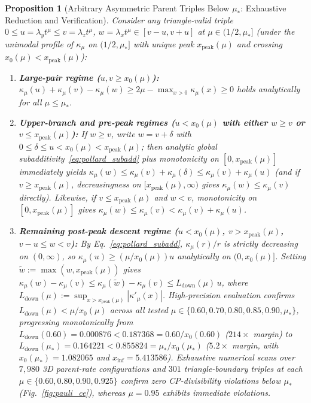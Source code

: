 \documentclass[twocolumn,10pt,amsmath,amssymb,floatfix]{revtex4-2}
\theoremstyle{plain}
\newtheorem{proposition}[theorem]{Proposition}
\theoremstyle{definition}
\newcommand{\mustar}{\mu_*}
\begin{document}
\begin{proposition}[Arbitrary Asymmetric Parent Triples Below $\mustar$: Exhaustive Reduction and Verification]
\label{prop:pauli_asymmetric}
Consider any triangle-valid triple $0 \le u = \lambda_y t^\mu \le v = \lambda_z t^\mu$, $w = \lambda_x t^\mu \in [v-u, v+u]$ at $\mu \in (1/2, \mustar]$ (under the unimodal profile of $\kappa_\mu$ on $(1/2, \mustar]$ with unique peak $x_{\mathrm{peak}}(\mu)$ and crossing $x_0(\mu) < x_{\mathrm{peak}}(\mu)$):
\begin{enumerate}[label=(\alph*),leftmargin=1.5em,itemsep=1pt]
\item \textbf{Large-pair regime ($u, v \ge x_0(\mu)$):} $\kappa_\mu(u) + \kappa_\mu(v) - \kappa_\mu(w) \ge 2\mu - \max_{x>0}\kappa_\mu(x) \ge 0$ holds \emph{analytically} for all $\mu \le \mustar$.
\item \textbf{Upper-branch and pre-peak regimes ($u < x_0(\mu)$ with either $w \ge v$ or $v \le x_{\mathrm{peak}}(\mu)$):} If $w \ge v$, write $w = v + \delta$ with $0 \le \delta \le u < x_0(\mu) < x_{\mathrm{peak}}(\mu)$; then analytic global subadditivity~\eqref{eq:pollard_subadd} plus monotonicity on $[0, x_{\mathrm{peak}}(\mu)]$ immediately yields $\kappa_\mu(w) \le \kappa_\mu(v) + \kappa_\mu(\delta) \le \kappa_\mu(v) + \kappa_\mu(u)$ (and if $v \ge x_{\mathrm{peak}}(\mu)$, decreasingness on $[x_{\mathrm{peak}}(\mu),\infty)$ gives $\kappa_\mu(w) \le \kappa_\mu(v)$ directly). Likewise, if $v \le x_{\mathrm{peak}}(\mu)$ and $w < v$, monotonicity on $[0, x_{\mathrm{peak}}(\mu)]$ gives $\kappa_\mu(w) \le \kappa_\mu(v) < \kappa_\mu(v) + \kappa_\mu(u)$.
\item \textbf{Remaining post-peak descent regime ($u < x_0(\mu)$, $v > x_{\mathrm{peak}}(\mu)$, $v - u \le w < v$):} By Eq.~\eqref{eq:pollard_subadd}, $\kappa_\mu(r)/r$ is strictly decreasing on $(0,\infty)$, so $\kappa_\mu(u) \ge (\mu/x_0(\mu))u$ analytically on $(0, x_0(\mu)]$. Setting $\tilde{w} := \max(w, x_{\mathrm{peak}}(\mu))$ gives $\kappa_\mu(w) - \kappa_\mu(v) \le \kappa_\mu(\tilde{w}) - \kappa_\mu(v) \le L_{\mathrm{down}}(\mu)\,u$, where $L_{\mathrm{down}}(\mu) := \sup_{x > x_{\mathrm{peak}}(\mu)} |\kappa'_\mu(x)|$. High-precision evaluation confirms $L_{\mathrm{down}}(\mu) < \mu/x_0(\mu)$ across all tested $\mu \in \{0.60, 0.70, 0.80, 0.85, 0.90, \mustar\}$, progressing monotonically from $L_{\mathrm{down}}(0.60) = 0.000876 < 0.187368 = 0.60/x_0(0.60)$ ($214\times$ margin) to $L_{\mathrm{down}}(\mustar) = 0.164221 < 0.855824 = \mustar/x_0(\mustar)$ ($5.2\times$ margin, with $x_0(\mustar) = 1.082065$ and $x_{\mathrm{inf}} = 5.413586$). Exhaustive numerical scans over $7{,}980$ 3D parent-rate configurations and $301$ triangle-boundary triples at each $\mu \in \{0.60, 0.80, 0.90, 0.925\}$ confirm zero CP-divisibility violations below $\mustar$ (Fig.~\ref{fig:pauli_ce}), whereas $\mu = 0.95$ exhibits immediate violations.
\end{enumerate}
\end{proposition}
\end{document}
